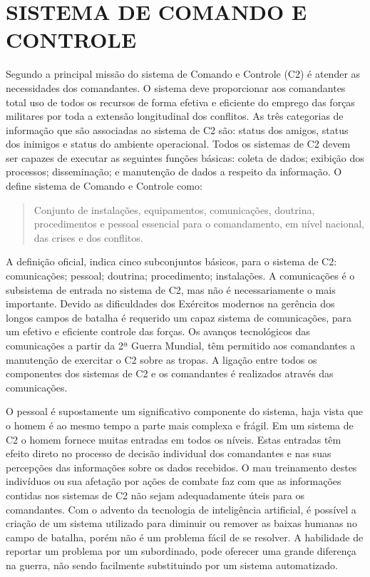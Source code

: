 \chapter{SISTEMA DE COMANDO E CONTROLE}
Segundo \cite{thesecommandandcontrol} a  principal missão do sistema de Comando e Controle (C2) é atender as necessidades dos comandantes. O sistema deve proporcionar aos comandantes total uso de todos os recursos de forma efetiva e eficiente do emprego das forças militares por toda a extensão longitudinal dos conflitos. As três categorias de informação que são associadas ao sistema de C2 são: status dos amigos, status dos inimigos e status do ambiente operacional. Todos os sistemas de C2 devem ser capazes de executar as seguintes funções básicas: coleta de dados; exibição dos processos; disseminação; e manutenção de dados a respeito da informação. O \cite{comandoecontrole2015} define sistema de Comando e Controle como: 
\begin{quote}
    Conjunto de instalações, equipamentos, comunicações, doutrina, procedimentos e pessoal essencial para o comandamento, em nível nacional, das crises e dos conflitos.
\end{quote}

A definição oficial, indica cinco subconjuntos básicos, para o sistema de C2: comunicações; pessoal;  doutrina; procedimento; instalações. A comunicações é o subsistema de entrada no sistema de C2, mas não é necessariamente o mais importante. Devido as  dificuldades dos Exércitos modernos na gerência dos longos campos de batalha é requerido um capaz sistema de comunicações, para um efetivo e eficiente controle das forças. Os avanços tecnológicos das comunicações a partir da 2ª Guerra Mundial, têm permitido aos comandantes a manutenção de exercitar o C2 sobre as tropas. A ligação entre todos os componentes dos sistemas de C2 e os comandantes é realizados através das comunicações.

O pessoal é supostamente um significativo componente do sistema, haja vista que o homem é ao mesmo tempo a parte mais complexa e frágil. Em um sistema de C2 o homem fornece muitas entradas em todos os níveis. Estas entradas têm efeito direto no processo de decisão individual dos comandantes e nas suas percepções das informações  sobre os dados recebidos. O mau treinamento destes indivíduos ou sua afetação por ações de combate faz com que as informações contidas nos sistemas de C2 não sejam adequadamente úteis para os comandantes. Com o advento da tecnologia de inteligência artificial, é possível a criação de um sistema utilizado para diminuir ou remover as baixas humanas no campo de batalha, porém não é um problema fácil de se resolver. A habilidade de reportar um problema por um subordinado, pode oferecer uma grande diferença na guerra, não sendo facilmente substituindo por um sistema automatizado.

